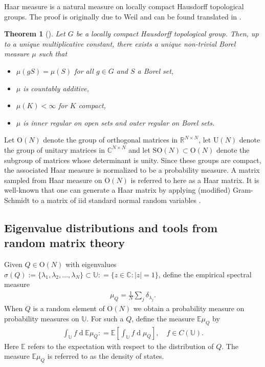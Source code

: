 \documentclass{amsart}
\newtheorem{theorem}{Theorem}[section]
\theoremstyle{definition}
\theoremstyle{remark}
\numberwithin{equation}{section}
\DeclareMathOperator{\D}{d}
\begin{document}
Haar measure is a natural measure on locally compact Hausdorff topological groups.  The proof is originally due to Weil \cite{Weil1951} and can be found translated in \cite{Nachbin1976}.
\begin{theorem}[\cite{Weil1951}]
Let $G$ be a locally compact Hausdorff topological group.  Then, up to a unique multiplicative constant, there exists a unique non-trivial Borel measure $\mu$ such that
\begin{itemize}
\item $\mu(gS)= \mu(S)$ for all $g \in G$ and $S$ a Borel set,
\item $\mu$ is countably additive,
\item $\mu(K) < \infty$ for $K$ compact,
\item $\mu$ is inner regular on open sets and outer regular on Borel sets.
\end{itemize}
\end{theorem}
Let $\mathrm{O}(N)$ denote the group of orthogonal matrices in $\mathbb R^{N \times N}$, let $\mathrm{U}(N)$ denote the group of unitary matrices in $\mathbb C^{N\times N}$ and let $\mathrm{SO}(N) \subset \mathrm{O}(N)$ denote the subgroup of matrices whose determinant is unity.  Since these groups are compact, the associated Haar measure is normalized to be a probability measure.  A matrix sampled from Haar measure on $\mathrm{O}(N)$ is referred to here as a Haar matrix.  It is well-known that one can generate a Haar matrix by applying (modified) Gram-Schmidt to a matrix of iid standard normal random variables \cite{Forrester2010,Mezzadri2006,Stewart1980}.

\subsection{Eigenvalue distributions and tools from random matrix theory}

Given $Q \in \mathrm O (N)$ with eigenvalues $\sigma(Q):= \{\lambda_1,\lambda_2,\ldots, \lambda_N\} \subset \mathbb U : = \{z \in \mathbb C : |z| = 1\}$, define the empirical spectral measure
\begin{align}
\mu_Q = \frac{1}{N} \sum_{j} \delta_{\lambda_j}.
\end{align}
When $Q$ is a random element of $\mathrm O(N)$ we obtain a probability measure on probability measures on $\mathbb U$.  For such a $Q$, define the measure $\mathbb E \mu_Q$ by
\begin{align}
\int_{\mathbb U} f \D \mathbb E \mu_Q : = \mathbb E \left[ \int_{\mathbb U} f \D \mu_Q \right],  \quad f \in C(\mathbb U).
\end{align}
Here $\mathbb E$ refers to the expectation with respect to the distribution of $Q$. The measure $\mathbb E \mu_Q$ is referred to as the density of states.
\end{document}
